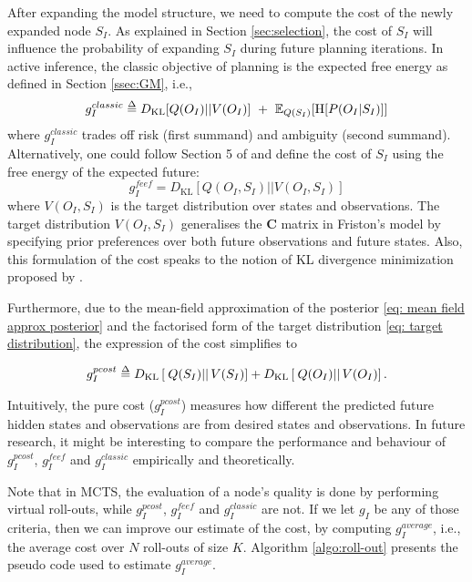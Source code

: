 \documentclass[twoside,11pt]{article}
\newcommand{\kl}[2]{D_{\mathrm{KL}} \left[ \left. \left. #1 \right|\right| #2 \right] }
\def\delequal{\mathrel{\ensurestackMath{\stackon[1pt]{=}{\scriptstyle\Delta}}}}
\begin{document}
After expanding the model structure, we need to compute the cost of the newly expanded node $S_I$. As explained in Section \ref{sec:selection}, the cost of $S_I$ will influence the probability of expanding $S_I$ during future planning iterations. In active inference, the classic objective of planning is the expected free energy as defined in Section \ref{ssec:GM}, i.e.,
\begin{align}
g^{classic}_I \delequal D_{\mathrm{KL}}[Q(O_I)||V(O_I)]\,\, +\,\, \mathbb{E}_{Q(S_I)}[\text{H}[P(O_I | S_I)]]
\end{align}
where $g^{classic}_I$ trades off risk (first summand) and ambiguity (second summand). Alternatively, one could follow Section 5 of \citet{millidge2020expected} and define the cost of $S_I$ using the free energy of the expected future:
\begin{equation}
    g^{feef}_I = \kl{Q(O_I, S_I)}{V(O_I, S_I)}
\end{equation}
where $V(O_I, S_I)$ is the target distribution over states and observations. The target distribution $V(O_I, S_I)$ generalises the $\bm{C}$ matrix in Friston's model by specifying prior preferences over both future observations and future states. Also, this formulation of the cost speaks to the notion of KL divergence minimization proposed by \citet{hafner2020action}.

Furthermore, due to the mean-field approximation of the posterior \eqref{eq: mean field approx posterior} and the factorised form of the target distribution \eqref{eq: target distribution}, the expression of the cost simplifies to

\begin{align}
g^{pcost}_I \delequal \kl{Q(S_I)}{V(S_I)} + \kl{Q(O_I)}{V(O_I)}.
\end{align}

Intuitively, the pure cost ($g^{pcost}_I$) measures how different the predicted future hidden states and observations are from desired states and observations. In future research, it might be interesting to compare the performance and behaviour of $g^{pcost}_I$, $g^{feef}_I$ and $g^{classic}_I$ empirically and theoretically. 

Note that in MCTS, the evaluation of a node's quality is done by performing virtual roll-outs, while $g^{pcost}_I$, $g^{feef}_I$ and $g^{classic}_I$ are not. If we let $g_I$ be any of those criteria, then we can improve our estimate of the cost, by computing $g_I^{average}$, i.e., the average cost over $N$ roll-outs of size $K$. Algorithm \ref{algo:roll-out} presents the pseudo code used to estimate $g_I^{average}$.
\end{document}
